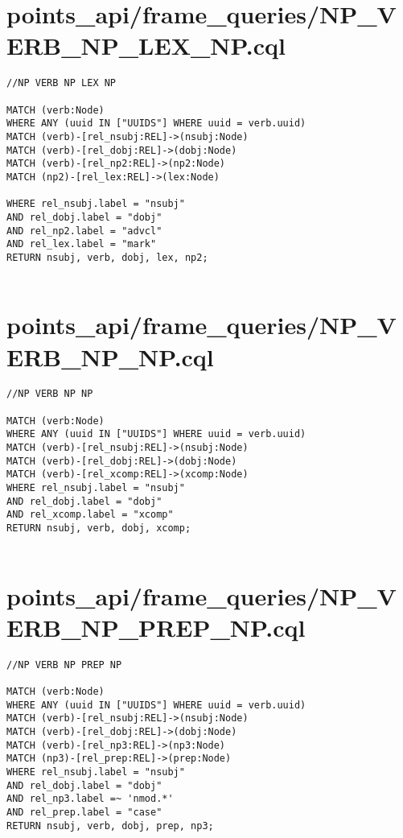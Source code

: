 \documentclass{article}
\begin{document}
\section*{points\_api/frame\_queries/NP\_VERB\_NP\_LEX\_NP.cql}
\begin{verbatim}
//NP VERB NP LEX NP

MATCH (verb:Node)
WHERE ANY (uuid IN ["UUIDS"] WHERE uuid = verb.uuid)
MATCH (verb)-[rel_nsubj:REL]->(nsubj:Node)
MATCH (verb)-[rel_dobj:REL]->(dobj:Node)
MATCH (verb)-[rel_np2:REL]->(np2:Node)
MATCH (np2)-[rel_lex:REL]->(lex:Node)

WHERE rel_nsubj.label = "nsubj"
AND rel_dobj.label = "dobj"
AND rel_np2.label = "advcl"
AND rel_lex.label = "mark"
RETURN nsubj, verb, dobj, lex, np2;


\end{verbatim}
\pagebreak

\section*{points\_api/frame\_queries/NP\_VERB\_NP\_NP.cql}
\begin{verbatim}
//NP VERB NP NP

MATCH (verb:Node)
WHERE ANY (uuid IN ["UUIDS"] WHERE uuid = verb.uuid)
MATCH (verb)-[rel_nsubj:REL]->(nsubj:Node)
MATCH (verb)-[rel_dobj:REL]->(dobj:Node)
MATCH (verb)-[rel_xcomp:REL]->(xcomp:Node)
WHERE rel_nsubj.label = "nsubj"
AND rel_dobj.label = "dobj"
AND rel_xcomp.label = "xcomp"
RETURN nsubj, verb, dobj, xcomp;


\end{verbatim}
\pagebreak

\section*{points\_api/frame\_queries/NP\_VERB\_NP\_PREP\_NP.cql}
\begin{verbatim}
//NP VERB NP PREP NP

MATCH (verb:Node)
WHERE ANY (uuid IN ["UUIDS"] WHERE uuid = verb.uuid)
MATCH (verb)-[rel_nsubj:REL]->(nsubj:Node)
MATCH (verb)-[rel_dobj:REL]->(dobj:Node)
MATCH (verb)-[rel_np3:REL]->(np3:Node)
MATCH (np3)-[rel_prep:REL]->(prep:Node)
WHERE rel_nsubj.label = "nsubj"
AND rel_dobj.label = "dobj"
AND rel_np3.label =~ 'nmod.*'
AND rel_prep.label = "case"
RETURN nsubj, verb, dobj, prep, np3;


\end{verbatim}
\pagebreak
\end{document}
